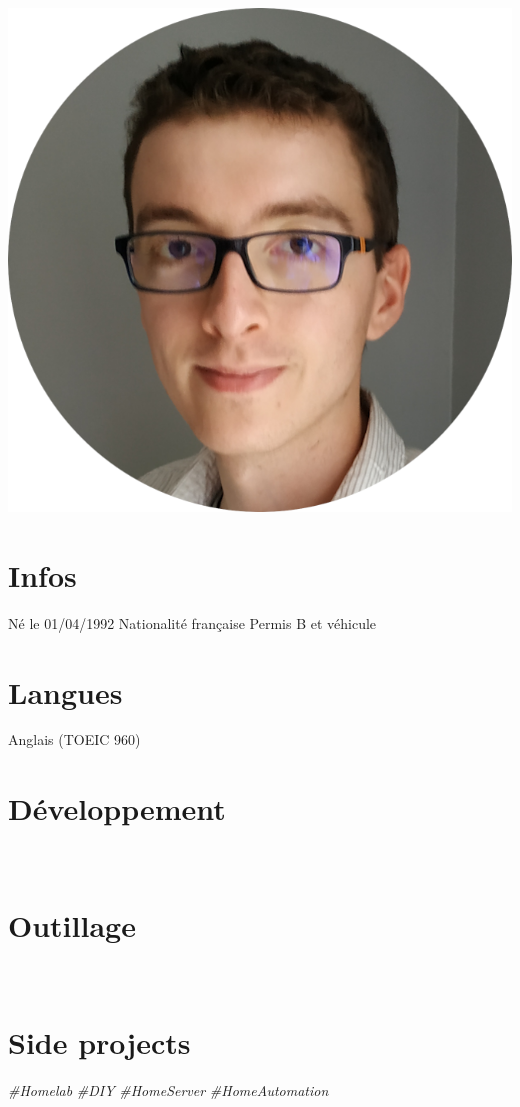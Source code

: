 \documentclass[]{friggeri-cv}
\begin{document}
\begin{aside}
  \includegraphics[scale=0.2]{img/photo.png} 
    \section{Infos}
    Né le 01/04/1992
    Nationalité française
    Permis B et véhicule
    ~
  \section{Langues}
    Anglais (TOEIC 960)
    ~
  \section{Développement}
    ~
  \section{Outillage}
    ~
   \section{Side projects}
    \textit{\#Homelab}
    \textit{\#DIY}
    \textit{\#HomeServer}
    \textit{\#HomeAutomation}
    ~
\end{aside}
~
\\
\\
\end{document}
